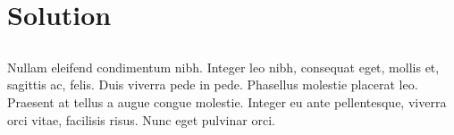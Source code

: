 \chapter{Solution} \label{chap:solution}

\section*{}

Nullam eleifend condimentum nibh. Integer leo nibh, consequat eget,
mollis et, sagittis ac, felis. Duis viverra pede in pede. Phasellus
molestie placerat leo. Praesent at tellus a augue congue molestie.
Integer eu ante pellentesque, viverra orci vitae, facilisis
risus. Nunc eget pulvinar orci.


